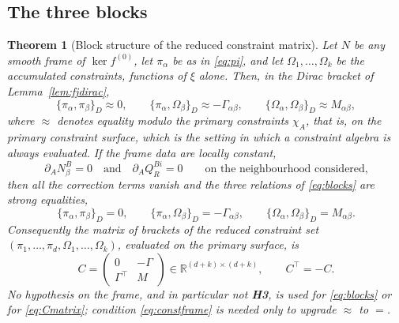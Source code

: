 \documentclass[12pt]{article}
\theoremstyle{plain}
\newtheorem{theorem}{Theorem}[section]
\theoremstyle{definition}
\theoremstyle{remark}
\newcommand{\R}{\mathbb{R}}
\newcommand{\pd}[1]{\partial_{#1}}
\newcommand{\Om}{\Omega}
\begin{document}
	\subsection{The three blocks}
	\label{sec:threeblocks}
	
	\begin{theorem}[Block structure of the reduced constraint matrix]
		\label{thm:dirac}
		Let $N$ be any smooth frame of $\ker f^{(0)}$, let $\pi_{\alpha}$ be as in
		\eqref{eq:pi}, and let $\Om_{1},\dots,\Om_{k}$ be the accumulated constraints,
		functions of $\xi$ alone. Then, in the Dirac bracket of
		Lemma~\ref{lem:fjdirac},
		\begin{equation}
			\{\pi_{\alpha},\pi_{\beta}\}_{D}\approx0,
			\qquad
			\{\pi_{\alpha},\Om_{\beta}\}_{D}\approx-\Gamma_{\alpha\beta},
			\qquad
			\{\Om_{\alpha},\Om_{\beta}\}_{D}\approx M_{\alpha\beta},
			\label{eq:blocks}
		\end{equation}
		where $\approx$ denotes equality modulo the primary constraints $\chi_{A}$, that
		is, on the primary constraint surface, which is the setting in which a
		constraint algebra is always evaluated. If the frame data are locally constant,
		\begin{equation}
			\pd{A}N_{\beta}^{B}=0
			\quad\text{and}\quad
			\pd{A}Q_{R}^{Bi}=0
			\qquad\text{on the neighbourhood considered,}
			\label{eq:constframe}
		\end{equation}
		then all the correction terms vanish and the three relations of
		\eqref{eq:blocks} are strong equalities,
		\begin{equation}
			\{\pi_{\alpha},\pi_{\beta}\}_{D}=0,
			\qquad
			\{\pi_{\alpha},\Om_{\beta}\}_{D}=-\Gamma_{\alpha\beta},
			\qquad
			\{\Om_{\alpha},\Om_{\beta}\}_{D}=M_{\alpha\beta}.
			\label{eq:blocksstrong}
		\end{equation}
		Consequently the matrix of brackets of the reduced constraint set
		$(\pi_{1},\dots,\pi_{d},\Om_{1},\dots,\Om_{k})$, evaluated on the primary
		surface, is
		\begin{equation}
			C=\begin{pmatrix}0&-\Gamma\\ \Gamma^{\top}&M\end{pmatrix}
			\in\R^{(d+k)\times(d+k)},
			\qquad C^{\top}=-C .
			\label{eq:Cmatrix}
		\end{equation}
		No hypothesis on the frame, and in particular not \textbf{H3}, is used for
		\eqref{eq:blocks} or for \eqref{eq:Cmatrix}; condition \eqref{eq:constframe} is
		needed only to upgrade $\approx$ to $=$.
	\end{theorem}
	
\end{document}
